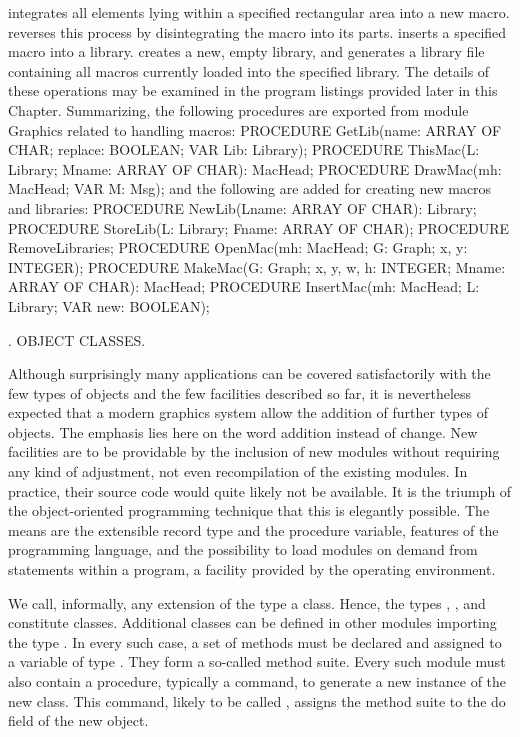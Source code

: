 integrates all elements lying within a specified rectangular area into a new macro.  reverses this process by disintegrating the macro into its parts.  inserts a specified macro into a library.  creates a new, empty library, and  generates a library file containing all macros currently loaded into the specified library. The details of these operations may be examined in the program listings provided later in this Chapter. Summarizing, the following procedures are exported from module Graphics related to handling macros:
\begintt
PROCEDURE GetLib(name: ARRAY OF CHAR; replace: BOOLEAN; VAR Lib: Library); PROCEDURE ThisMac(L: Library; Mname: ARRAY OF CHAR): MacHead; PROCEDURE DrawMac(mh: MacHead; VAR M: Msg);
\endtt
and the following are added for creating new macros and libraries:
\begintt
PROCEDURE NewLib(Lname: ARRAY OF CHAR): Library;
PROCEDURE StoreLib(L: Library; Fname: ARRAY OF CHAR);
PROCEDURE RemoveLibraries;
PROCEDURE OpenMac(mh: MacHead; G: Graph; x, y: INTEGER);
PROCEDURE MakeMac(G: Graph; x, y, w, h: INTEGER; Mname: ARRAY OF CHAR): MacHead; PROCEDURE InsertMac(mh: MacHead; L: Library; VAR new: BOOLEAN);
\endtt

. OBJECT CLASSES.

Although surprisingly many applications can be covered satisfactorily with the few types of objects and the few facilities described so far, it is nevertheless expected that a modern graphics system allow the addition of further types of objects. The emphasis lies here on the word addition instead of change. New facilities are to be providable by the inclusion of new modules without requiring any kind of adjustment, not even recompilation of the existing modules. In practice, their source code would quite likely not be available. It is the triumph of the object-oriented programming technique that this is elegantly possible. The means are the extensible record type and the procedure variable, features of the programming language, and the possibility to load modules on demand from statements within a program, a facility provided by the operating environment.

We call, informally, any extension of the type  a class. Hence, the types , , and  constitute classes. Additional classes can be defined in other modules importing the type . In every such case, a set of methods must be declared and assigned to a variable of type . They form a so-called method suite. Every such module must also contain a procedure, typically a command, to generate a new instance of the new class. This command, likely to be called , assigns the method suite to the do field of the new object.

